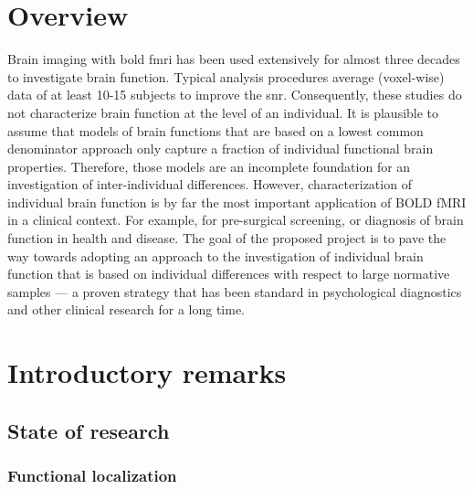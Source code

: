 \section{Overview}




%
Brain imaging with \ac{bold} \ac{fmri} has been used extensively for almost
three decades to investigate brain function.
%
Typical analysis procedures average (voxel-wise) data of at least 10-15 subjects
to improve the \ac{snr}.
%
Consequently, these studies do not characterize brain function at the level of
an individual.
%
It is plausible to assume that models of brain functions that are based on a
lowest common denominator approach only capture a fraction of individual
functional brain properties.
%
Therefore, those models are an incomplete foundation for an investigation of
inter-individual differences.
%
However, characterization of individual brain function is by far the most
important application of BOLD fMRI in a clinical context.
%
For example, for pre-surgical screening, or diagnosis of brain function in
health and disease.
%
The goal of the proposed project is to pave the way towards adopting an approach
to the investigation of individual brain function that is based on individual
differences with respect to large normative samples --- a proven strategy that
has been standard in psychological diagnostics and other clinical research for a
long time.


\section{Introductory remarks}


\subsection{State of research}


\subsubsection{Functional localization}

